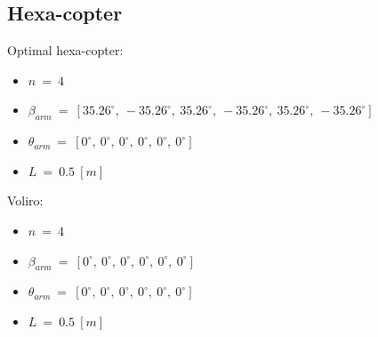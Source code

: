 \begin{table}[!h]
\begin{center}
 \caption{Comparison between the two designs' hover capabilities.}\vspace{1ex}
 \label{tab:tab_Quad_compare_hover}
\end{center}
\end{table}

\subsection{Hexa-copter}
\label{sec:hexa_copter}

Optimal hexa-copter:
\begin{itemize}
  \item $n\ =\ 4$
  \item $\beta_{arm}\ =\ [35.26^{\circ},\  -35.26^{\circ},\  35.26^{\circ},\  -35.26^{\circ},\
                          35.26^{\circ},\  -35.26^{\circ}]$
  \item $\theta_{arm}\ =\ [0^{\circ},\  0^{\circ},\  0^{\circ},\  0^{\circ},\ 0^{\circ},\  0^{\circ}]$
  \item $L\ =\ 0.5\ [m]$
\end{itemize}

Voliro:
\begin{itemize}
  \item $n\ =\ 4$
  \item $\beta_{arm}\ =\ [0^{\circ},\  0^{\circ},\  0^{\circ},\  0^{\circ},\ 0^{\circ},\  0^{\circ}]$
  \item $\theta_{arm}\ =\ [0^{\circ},\  0^{\circ},\  0^{\circ},\  0^{\circ},\ 0^{\circ},\  0^{\circ}]$
  \item $L\ =\ 0.5\ [m]$
\end{itemize}

